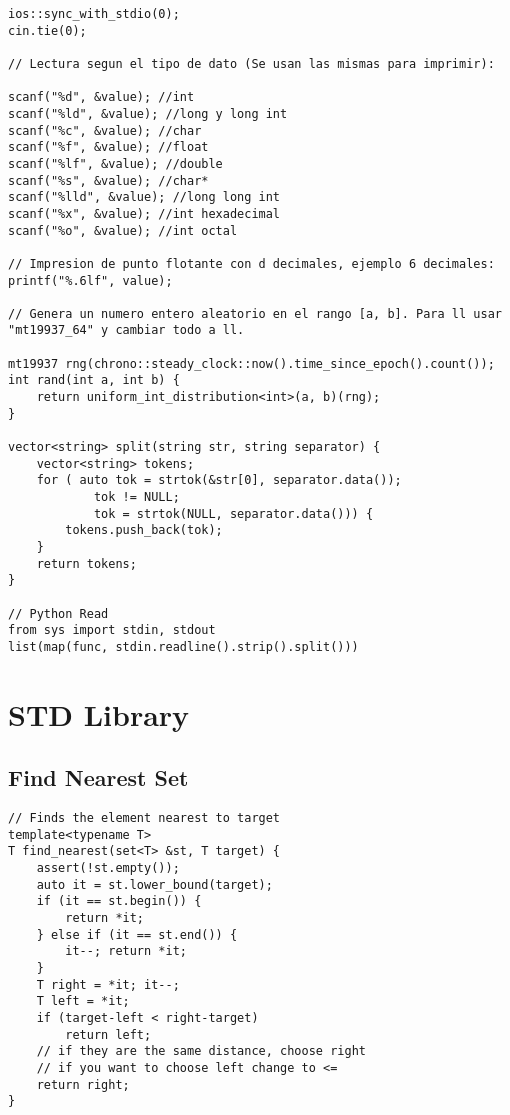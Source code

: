 \documentclass[10pt,letterpaper,twocolumn,twosided]{article}
\begin{document}
\begin{lstlisting}
ios::sync_with_stdio(0);
cin.tie(0);

// Lectura segun el tipo de dato (Se usan las mismas para imprimir):

scanf("%d", &value); //int
scanf("%ld", &value); //long y long int
scanf("%c", &value); //char 
scanf("%f", &value); //float
scanf("%lf", &value); //double
scanf("%s", &value); //char*
scanf("%lld", &value); //long long int
scanf("%x", &value); //int hexadecimal
scanf("%o", &value); //int octal

// Impresion de punto flotante con d decimales, ejemplo 6 decimales:
printf("%.6lf", value);

// Genera un numero entero aleatorio en el rango [a, b]. Para ll usar "mt19937_64" y cambiar todo a ll.

mt19937 rng(chrono::steady_clock::now().time_since_epoch().count());
int rand(int a, int b) {
    return uniform_int_distribution<int>(a, b)(rng);
}

vector<string> split(string str, string separator) {
    vector<string> tokens;
    for ( auto tok = strtok(&str[0], separator.data());
            tok != NULL;
            tok = strtok(NULL, separator.data())) {
        tokens.push_back(tok);
    }
    return tokens;
}

// Python Read
from sys import stdin, stdout
list(map(func, stdin.readline().strip().split()))
\end{lstlisting}



\section{STD Library}

\subsection{Find Nearest Set}
\begin{lstlisting}
// Finds the element nearest to target
template<typename T>
T find_nearest(set<T> &st, T target) {
    assert(!st.empty());
    auto it = st.lower_bound(target);
    if (it == st.begin()) {
        return *it;
    } else if (it == st.end()) {
        it--; return *it;
    }
    T right = *it; it--;
    T left = *it;
    if (target-left < right-target) 
        return left;
    // if they are the same distance, choose right
    // if you want to choose left change to <=
    return right;
}
\end{lstlisting}
\end{document}
